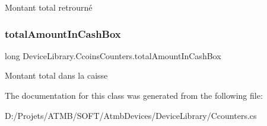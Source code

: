 Montant total retrourné 

\mbox{\label{class_device_library_1_1_ccoins_counters_a45bb315e1e87de4c64eaeb5db43fe73e}} 
\subsubsection{\texorpdfstring{total\+Amount\+In\+Cash\+Box}{totalAmountInCashBox}}
{\footnotesize\ttfamily long Device\+Library.\+Ccoins\+Counters.\+total\+Amount\+In\+Cash\+Box}



Montant total dans la caisse 



The documentation for this class was generated from the following file\+:\begin{DoxyCompactItemize}
\item 
D\+:/\+Projets/\+A\+T\+M\+B/\+S\+O\+F\+T/\+Atmb\+Devices/\+Device\+Library/Ccounters.\+cs\end{DoxyCompactItemize}
